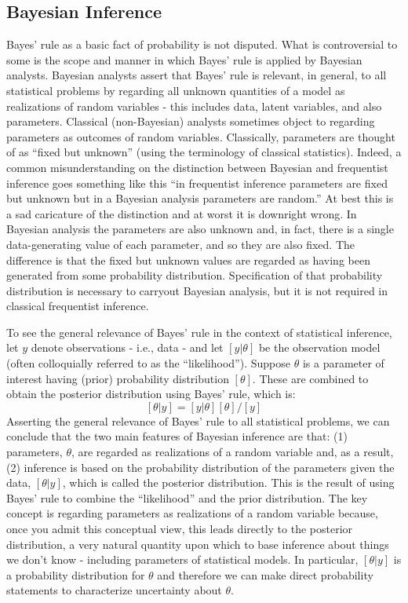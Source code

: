 \subsection{Bayesian Inference}

Bayes' rule as a basic fact of probability is not disputed.
What is controversial to some is the scope and manner in which Bayes'
rule is applied by Bayesian analysts. Bayesian analysts assert that
Bayes' rule is relevant, in general, to all statistical problems by
regarding all unknown quantities of a model as realizations of random
variables - this includes data, latent variables, and also
parameters. Classical (non-Bayesian) analysts sometimes object to
regarding parameters as outcomes of random variables. Classically,
parameters are thought of as ``fixed but unknown'' (using the
terminology of classical statistics).
Indeed, a common misunderstanding on the distinction between Bayesian and
frequentist inference goes something like this ``in frequentist
inference parameters are fixed but unknown but in a Bayesian analysis
parameters are random.'' At best this is a sad caricature of the
distinction and at worst it is downright wrong. 
In Bayesian analysis the
parameters are also unknown and, in fact, there is a single data-generating
value of each parameter, and so they are also fixed.
The difference is that the fixed
but unknown values are  regarded as having been generated from some
probability distribution. Specification of that probability
distribution is necessary to carryout Bayesian analysis, but it is not
required in classical frequentist inference.


To see the general relevance of Bayes' rule in the context of
statistical inference, let $y$ denote observations - i.e., data -
and let $[y|\theta]$ be the observation model (often colloquially
referred to as the ``likelihood'').  Suppose $\theta$ 
is a parameter of
interest having (prior) probability distribution $[\theta]$. These are
combined to obtain the posterior distribution using Bayes' rule, which
is:
\[
 [\theta|y]= [y|\theta][\theta]/[y]
\]
Asserting the general relevance of Bayes' rule to all statistical
problems, we can conclude that the two main features of Bayesian
inference are that: (1) parameters, $\theta$, are regarded as realizations of
a random variable and, as a result, (2) inference is based on the
probability distribution of the parameters given the data,
$[\theta|y]$,
which is
called the posterior distribution. This is the result of using Bayes'
rule to combine the ``likelihood'' and the prior distribution.  The
key concept is regarding parameters as realizations of a random
variable because, once you admit this conceptual view, this leads
directly to the posterior distribution, a very natural quantity upon
which to base inference about things we don't know -  including
parameters of statistical models.  In particular, $[\theta|y]$ is a
probability distribution for $\theta$ and therefore we can make direct
probability statements to characterize uncertainty about
$\theta$.


